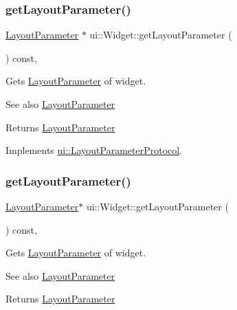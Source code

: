\subsubsection{\texorpdfstring{get\+Layout\+Parameter()}{getLayoutParameter()}\hspace{0.1cm}{\footnotesize\ttfamily [1/4]}}
{\footnotesize\ttfamily \hyperlink{classui_1_1LayoutParameter}{Layout\+Parameter} $\ast$ ui\+::\+Widget\+::get\+Layout\+Parameter (\begin{DoxyParamCaption}{ }\end{DoxyParamCaption}) const\hspace{0.3cm}{\ttfamily [override]}, {\ttfamily [virtual]}}

Gets \hyperlink{classui_1_1LayoutParameter}{Layout\+Parameter} of widget.

\begin{DoxySeeAlso}{See also}
\hyperlink{classui_1_1LayoutParameter}{Layout\+Parameter} 
\end{DoxySeeAlso}
\begin{DoxyReturn}{Returns}
\hyperlink{classui_1_1LayoutParameter}{Layout\+Parameter} 
\end{DoxyReturn}


Implements \hyperlink{classui_1_1LayoutParameterProtocol_a188012c584b8f9ccca95b1dffea6fb0b}{ui\+::\+Layout\+Parameter\+Protocol}.

\mbox{\label{classui_1_1Widget_a4d8d234130e8bd8214fa924369b8060f}} 
\subsubsection{\texorpdfstring{get\+Layout\+Parameter()}{getLayoutParameter()}\hspace{0.1cm}{\footnotesize\ttfamily [2/4]}}
{\footnotesize\ttfamily \hyperlink{classui_1_1LayoutParameter}{Layout\+Parameter}$\ast$ ui\+::\+Widget\+::get\+Layout\+Parameter (\begin{DoxyParamCaption}{ }\end{DoxyParamCaption}) const\hspace{0.3cm}{\ttfamily [override]}, {\ttfamily [virtual]}}

Gets \hyperlink{classui_1_1LayoutParameter}{Layout\+Parameter} of widget.

\begin{DoxySeeAlso}{See also}
\hyperlink{classui_1_1LayoutParameter}{Layout\+Parameter} 
\end{DoxySeeAlso}
\begin{DoxyReturn}{Returns}
\hyperlink{classui_1_1LayoutParameter}{Layout\+Parameter} 
\end{DoxyReturn}


